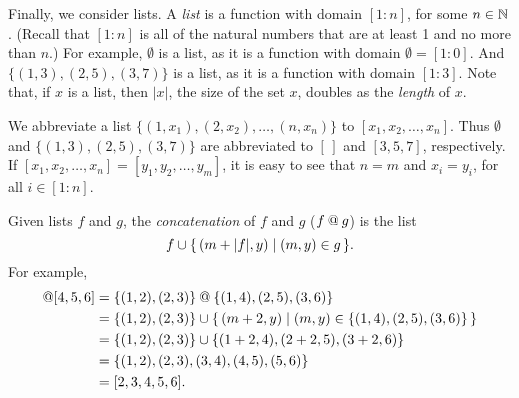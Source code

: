 %
Finally, we consider lists.  A \emph{list} is a function with domain
$[1:n]$, for some $n\in\mathbb{N}$.  (Recall that $[1:n]$ is all of the
natural numbers that are at least 1 and no more than $n$.)
For example, $\emptyset$ is a list, as
it is a function with domain $\emptyset=[1:0]$.  And $\{(1, 3), (2,
5), (3, 7)\}$ is a list, as it is a function with domain $[1:3]$.
Note that, if $x$ is a list, then $|x|$, the size of the set $x$,
doubles as the \emph{length} of $x$.

We abbreviate a list $\{(1,x_1),(2,x_2),\ldots,(n,x_n)\}$ to
$[x_1,x_2,\ldots,x_n]$.
%
%
Thus $\emptyset$ and $\{(1, 3), (2, 5), (3,
7)\}$ are abbreviated to $[\,]$ and $[3,5,7]$, respectively.
If $[x_1,x_2,\ldots,x_n]=[y_1,y_2,\ldots,y_m]$, it is easy to
see that $n=m$ and $x_i=y_i$, for all $i\in[1:n]$.

Given lists $f$ and $g$, the \emph{concatenation} of $f$ and $g$
($f\mathbin{@} g$)
%
%
%
%
is the list
\begin{displaymath}
f\cup\{ \, (m+|f|,y) \mid (m,y)\in g \, \} .  
\end{displaymath}
For example,
\begin{align*}
[2, 3]\myconcat[4,5,6] &=
\{(1, 2), (2, 3)\}\myconcat\{(1, 4), (2, 5), (3, 6)\} \\
&= \{(1, 2), (2, 3)\} \cup
\setof{(m+2,y)}{(m,y)\in\{(1, 4), (2, 5), (3, 6)\}} \\
&= \{(1, 2), (2, 3)\} \cup
\{(1 + 2, 4), (2 + 2, 5), (3 + 2, 6)\} \\
&= \{(1, 2), (2, 3), (3, 4), (4, 5), (5, 6)\} \\
&= [2,3,4,5,6] .
\end{align*}

